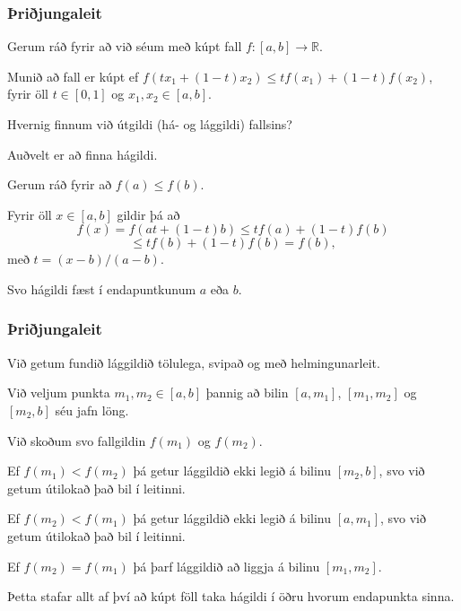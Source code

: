 {
}

{
    {
        \frametitle{Þriðjungaleit}
        \item<1-> Gerum ráð fyrir að við séum með kúpt fall $f \colon [a, b] \rightarrow \mathbb{R}$.
        \item<2-> Munið að fall er kúpt ef $f(tx_1 + (1 - t)x_2) \leq tf(x_1) + (1 - t)f(x_2)$, fyrir öll $t \in [0, 1]$ og $x_1, x_2 \in [a, b]$.
        \item<3-> Hvernig finnum við útgildi (há- og lággildi) fallsins?
        \item<4-> Auðvelt er að finna hágildi.
        \item<5-> Gerum ráð fyrir að $f(a) \leq f(b)$.
        \item<6-> Fyrir öll $x \in [a, b]$ gildir þá að
        \[
            f(x) = f(at + (1 - t)b) \leq tf(a) + (1 - t)f(b)
        \]
        \[
            \leq tf(b) + (1 - t)f(b) = f(b),
        \]
        með $t = (x - b)/(a - b)$.
        \item<7-> Svo hágildi fæst í endapuntkunum $a$ eða $b$.
    }
}

{
    {
        \frametitle{Þriðjungaleit}
        \item<1-> Við getum fundið lággildið tölulega, svipað og með helmingunarleit.
        \item<2-> Við veljum punkta $m_1, m_2 \in [a, b]$ þannig að bilin $[a, m_1]$, $[m_1, m_2]$ og $[m_2, b]$ séu jafn löng.
        \item<3-> Við skoðum svo fallgildin $f(m_1)$ og $f(m_2)$.
        \item<4-> Ef $f(m_1) < f(m_2)$ þá getur lággildið ekki legið á bilinu $[m_2, b]$, svo við getum útilokað það bil í leitinni.
        \item<5-> Ef $f(m_2) < f(m_1)$ þá getur lággildið ekki legið á bilinu $[a, m_1]$, svo við getum útilokað það bil í leitinni.
        \item<6-> Ef $f(m_2) = f(m_1)$ þá þarf lággildið að liggja á bilinu $[m_1, m_2]$.
        \item<7-> Þetta stafar allt af því að kúpt föll taka hágildi í öðru hvorum endapunkta sinna.
    }
}

